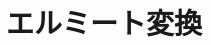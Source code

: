 \documentclass[../../../topic_linear-algebra]{subfiles}
\begin{document}
\sectionline
\section{エルミート変換}

\todo{}
\end{document}
